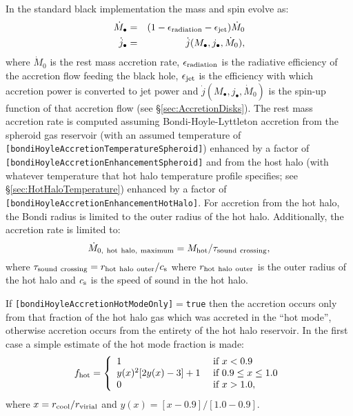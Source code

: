 In the standard black implementation the mass and spin evolve as:
\begin{eqnarray}
\dot{M}_\bullet &=& (1-\epsilon_{\rm radiation}-\epsilon_{\rm jet}) \dot{M}_0 \\
\dot{j}_\bullet &=& \dot{j}(M_\bullet,j_\bullet,\dot{M}_0),
\end{eqnarray}
where $\dot{M}_0$ is the rest mass accretion rate, $\epsilon_{\rm radiation}$ is the radiative efficiency of the accretion flow feeding the black hole, $\epsilon_{\rm jet}$ is the efficiency with which accretion power is converted to jet power and $\dot{j}(M_\bullet,j_\bullet,\dot{M}_0)$ is the spin-up function of that accretion flow (see \S\ref{sec:AccretionDisks}). The rest mass accretion rate is computed assuming Bondi-Hoyle-Lyttleton accretion from the spheroid gas reservoir (with an assumed temperature of {\tt [bondiHoyleAccretionTemperatureSpheroid]}) enhanced by a factor of {\tt [bondiHoyleAccretionEnhancementSpheroid]} and from the host halo (with whatever temperature that hot halo temperature profile specifies; see \S\ref{sec:HotHaloTemperature}) enhanced by a factor of {\tt [bondiHoyleAccretionEnhancementHotHalo]}. For accretion from the hot halo, the Bondi radius is limited to the outer radius of the hot halo. Additionally, the accretion rate is limited to:
\begin{equation}
 \dot{M}_{\rm 0,~hot~halo,~maximum} = M_{\rm hot}/\tau_{\rm sound~crossing},
\end{equation}
where $\tau_{\rm sound~crossing}=r_{\rm hot~halo~outer}/c_{\rm s}$ where $r_{\rm hot~halo~outer}$ is the outer radius of the hot halo and $c_{\rm s}$ is the speed of sound in the hot halo.

If {\tt [bondiHoyleAccretionHotModeOnly]}$=${\tt true} then the accretion occurs only from that fraction of the hot halo gas which was accreted in the ``hot mode'', otherwise accretion 
occurs from the entirety of the hot halo reservoir. In the first case a simple estimate of the hot mode fraction is made:
\begin{equation}
f_{\rm hot} = \left\{ \begin{array}{ll} 1 & \hbox{ if } x < 0.9 \\ y(x)^2[2 y(x) - 3]+1  & \hbox{ if } 0.9 \le x \le 1.0 \\ 0 & \hbox{ if } x > 1.0, \end{array} \right.
\end{equation}
where $x = r_{\rm cool}/r_{\rm virial}$ and $y(x)=[x-0.9]/[1.0-0.9]$.

